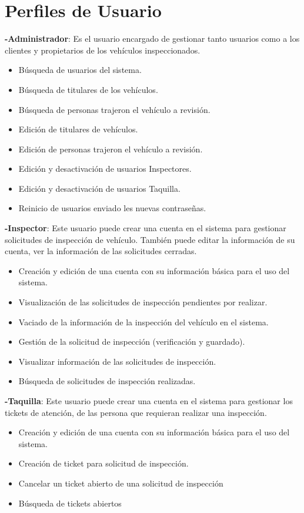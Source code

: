 \setlength{\parskip}{0mm}


\section{Perfiles de Usuario} 
\setlength{\parskip}{5mm}

\textbf{-Administrador}: Es el usuario encargado de gestionar tanto usuarios como a los clientes y propietarios de los vehículos inspeccionados.
	\begin{itemize}
		\item Búsqueda de usuarios del sistema.
		\item Búsqueda de titulares de los vehículos.
		\item Búsqueda de personas trajeron el vehículo a revisión. 
		\item Edición de titulares de vehículos.
		\item Edición de personas trajeron el vehículo a revisión.
		\item Edición y desactivación de usuarios Inspectores.
		\item Edición y desactivación de usuarios Taquilla.
		\item Reinicio de usuarios enviado les nuevas contraseñas.
	\end{itemize}

\textbf{-Inspector}: Este usuario puede crear una cuenta en el sistema para gestionar solicitudes de inspección de vehículo. También puede editar la información de su cuenta, ver la información de las solicitudes cerradas. 
	\begin{itemize}
		\item Creación y edición de una cuenta con su información básica para el uso del sistema.
		\item Visualización de las solicitudes de inspección pendientes por realizar.
		\item Vaciado de la información de la inspección del vehículo en el sistema.
		\item Gestión de la solicitud de inspección (verificación y guardado). 
		\item Visualizar información de las solicitudes de inspección.
		\item Búsqueda de solicitudes de inspección realizadas.
	\end{itemize}

\textbf{-Taquilla}: Este usuario puede crear una cuenta en el sistema para gestionar los tickets de atención, de las persona que requieran realizar una inspección.
	\begin{itemize}
		\item Creación y edición de una cuenta con su información básica para el uso del sistema.
		\item Creación de ticket para solicitud de inspección.
		\item Cancelar un ticket abierto de una solicitud de inspección 
		\item Búsqueda de tickets abiertos
	\end{itemize}


